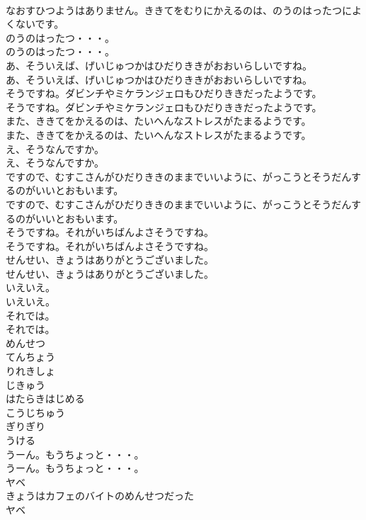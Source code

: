 \documentclass[8pt]{extreport}
\begin{document}
\begin{CJK}{UTF8}{min}
\\	なおすひつようはありません。ききてをむりにかえるのは、のうのはったつによくないです。
\\	のうのはったつ・・・。
\\	のうのはったつ・・・。
\\	あ、そういえば、げいじゅつかはひだりききがおおいらしいですね。
\\	あ、そういえば、げいじゅつかはひだりききがおおいらしいですね。
\\	そうですね。ダビンチやミケランジェロもひだりききだったようです。
\\	そうですね。ダビンチやミケランジェロもひだりききだったようです。
\\	また、ききてをかえるのは、たいへんなストレスがたまるようです。
\\	また、ききてをかえるのは、たいへんなストレスがたまるようです。
\\	え、そうなんですか。
\\	え、そうなんですか。
\\	ですので、むすこさんがひだりききのままでいいように、がっこうとそうだんするのがいいとおもいます。
\\	ですので、むすこさんがひだりききのままでいいように、がっこうとそうだんするのがいいとおもいます。
\\	そうですね。それがいちばんよさそうですね。
\\	そうですね。それがいちばんよさそうですね。
\\	せんせい、きょうはありがとうございました。
\\	せんせい、きょうはありがとうございました。
\\	いえいえ。
\\	いえいえ。
\\	それでは。
\\	それでは。
\\	めんせつ
\\	てんちょう
\\	りれきしょ
\\	じきゅう
\\	はたらきはじめる
\\	こうじちゅう
\\	ぎりぎり
\\	うける
\\	うーん。もうちょっと・・・。
\\	うーん。もうちょっと・・・。
\\	ヤベ
\\	きょうはカフェのバイトのめんせつだった
\\	ヤベ

\end{CJK}
\end{document}

